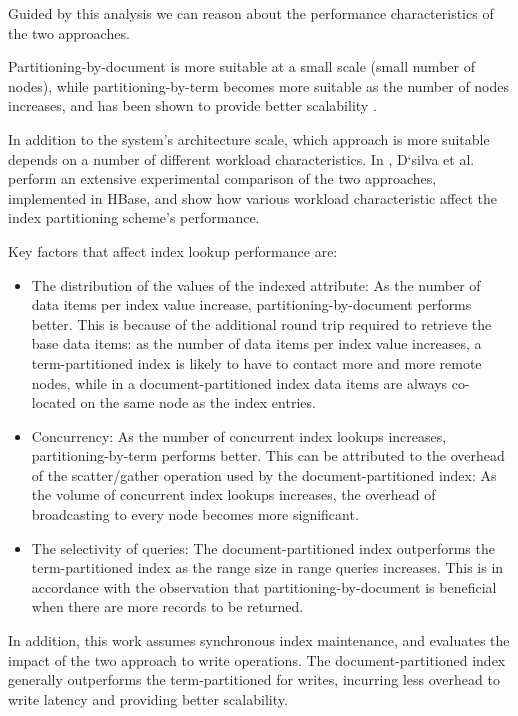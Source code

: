 Guided by this analysis we can reason about the performance characteristics of the two approaches.

Partitioning-by-document is more suitable at a small scale (small number of nodes),
while partitioning-by-term becomes more suitable as the number of nodes increases,
and has been shown to provide better scalability \cite{kejriwal:slik}.

In addition to the system's architecture scale,
which approach is more suitable depends on a number of different workload characteristics.
In \cite{dsilva:tworings}, D`silva et al. perform an extensive experimental comparison of the two approaches,
implemented in HBase, and show how various workload characteristic affect the index partitioning scheme's performance.

Key factors that affect index lookup performance are:
\begin{itemize}

  \item The distribution of the values of the indexed attribute:
  As the number of data items per index value increase, partitioning-by-document performs better.
  This is because of the additional round trip required to retrieve the base data items:
  as the number of data items per index value increases, a term-partitioned index is likely to have to contact
  more and more remote nodes, while in a document-partitioned index data items are always co-located on the same node as
  the index entries.

  \item Concurrency:
  As the number of concurrent index lookups increases, partitioning-by-term performs better.
  This can be attributed to the overhead of the scatter/gather operation used by the document-partitioned index:
  As the volume of concurrent index lookups increases,
  the overhead of broadcasting to every node becomes more significant.

  \item The selectivity of queries:
  The document-partitioned index outperforms the term-partitioned index as the range size in range queries increases.
  This is in accordance with the observation that partitioning-by-document is beneficial when there are
  more records to be returned.

\end{itemize}

In addition, this work assumes synchronous index maintenance, and evaluates the impact of the two approach to write
operations.
The document-partitioned index generally outperforms the term-partitioned for writes,
incurring less overhead to write latency and providing better scalability.

